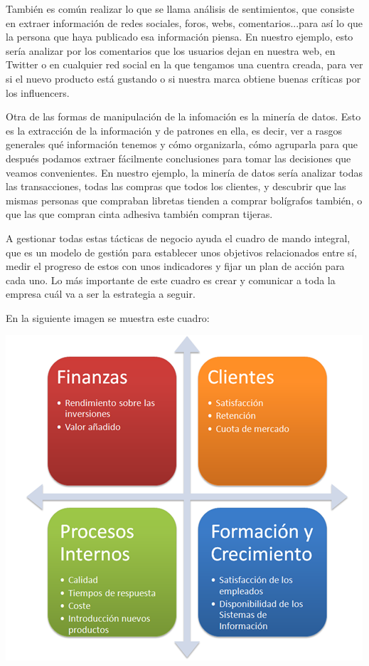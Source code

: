 \documentclass{article}
\begin{document}
También es común realizar lo que se llama análisis de sentimientos, que consiste en extraer información de redes sociales, foros, webs, comentarios...para así lo que la persona que haya publicado esa información piensa. En nuestro ejemplo, esto sería analizar por los comentarios que los usuarios dejan en nuestra web, en Twitter o en cualquier red social en la que tengamos una cuentra creada, para ver si el nuevo producto está gustando o si nuestra marca obtiene buenas críticas por los influencers. 

Otra de las formas de manipulación de la infomación es la minería de datos. Esto es la extracción de la información y de patrones en ella, es decir, ver a rasgos generales qué información tenemos y cómo organizarla, cómo agruparla para que después podamos extraer fácilmente conclusiones para tomar las decisiones que veamos convenientes.  En nuestro ejemplo, la minería de datos sería analizar todas las transacciones, todas las compras que todos los clientes, y descubrir que las mismas personas que compraban libretas tienden a comprar bolígrafos también, o que las que compran cinta adhesiva también compran tijeras.

A gestionar todas estas tácticas de negocio ayuda el cuadro de mando integral, que es un modelo de gestión para establecer unos objetivos relacionados entre sí, medir el progreso de estos con unos indicadores y fijar un plan de acción para cada uno. Lo más importante de este cuadro es crear y comunicar a toda la empresa cuál va a ser la estrategia a seguir.

En la siguiente imagen se muestra este cuadro:

\begin{flushleft}
\includegraphics[scale=0.7]{Cuadro-de-Mando-Integral1.png}
\end{flushleft}
\end{document}

